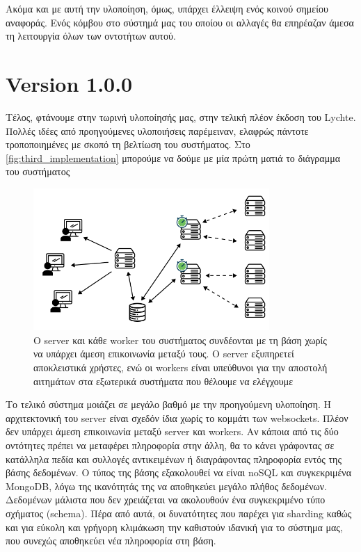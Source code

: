 Ακόμα και με αυτή την υλοποίηση, όμως, υπάρχει έλλειψη ενός κοινού σημείου αναφοράς. Ενός κόμβου στο σύστημά μας του οποίου
οι αλλαγές θα επηρέαζαν άμεσα τη λειτουργία όλων των οντοτήτων αυτού.

\section{Version 1.0.0}
\label{section:third_implementation}

Τέλος, φτάνουμε στην τωρινή υλοποίησής μας, στην τελική πλέον έκδοση του Lychte. Πολλές ιδέες από προηγούμενες υλοποιήσεις
παρέμειναν, ελαφρώς πάντοτε τροποποιημένες με σκοπό τη βελτίωση του συστήματος. Στο \autoref{fig:third_implementation} μπορούμε να δούμε με μία πρώτη ματιά
το διάγραμμα του συστήματος

\begin{figure}[!ht]
	\centering
	\includegraphics[width=0.8\textwidth]{./images/chapter4/lychte-third-implementation.png}
	\caption[Διάγραμμα Τελικής Υλοποίησης]{Ο server και κάθε worker του συστήματος συνδέονται με τη βάση χωρίς να υπάρχει άμεση επικοινωνία μεταξύ τους. Ο server εξυπηρετεί αποκλειστικά χρήστες, ενώ οι workers είναι υπεύθυνοι για την αποστολή αιτημάτων στα εξωτερικά συστήματα που θέλουμε να ελέγχουμε}
	\label{fig:third_implementation}
\end{figure}

Το τελικό σύστημα μοιάζει σε μεγάλο βαθμό με την προηγούμενη υλοποίηση. Η αρχιτεκτονική του server είναι σχεδόν ίδια χωρίς το κομμάτι των websockets.
Πλέον δεν υπάρχει άμεση επικοινωνία μεταξύ server και workers. Αν κάποια από τις δύο οντότητες πρέπει να μεταφέρει
πληροφορία στην άλλη, θα το κάνει γράφοντας σε κατάλληλα πεδία και συλλογές αντικειμένων ή διαγράφοντας πληροφορία εντός της βάσης δεδομένων.
Ο τύπος της βάσης εξακολουθεί να είναι noSQL και συγκεκριμένα MongoDB, λόγω της ικανότητάς της να αποθηκεύει μεγάλο πλήθος δεδομένων. Δεδομένων μάλιστα που δεν χρειάζεται
να ακολουθούν ένα συγκεκριμένο τύπο σχήματος (schema). Πέρα από αυτά, οι δυνατότητες που παρέχει για sharding καθώς και για
εύκολη και γρήγορη κλιμάκωση την καθιστούν ιδανική για το σύστημα μας, που συνεχώς αποθηκεύει νέα πληροφορία στη βάση.

